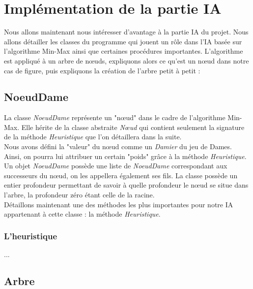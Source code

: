 \documentclass[12,french]{report}
\begin{document}
\section{Implémentation de la partie IA}

Nous allons maintenant nous intéresser d'avantage à la partie IA du projet. Nous allons détailler les classes du programme qui jouent un rôle dans l'IA basée sur l'algorithme Min-Max ainsi que certaines procédures importantes. L'algorithme est appliqué à un arbre de nœuds, expliquons alors ce qu'est un nœud dans notre cas de figure, puis expliquons la création de l'arbre petit à petit :

\subsection{NoeudDame}

La classe \textit{NoeudDame} représente un "nœud" dans le cadre de l'algorithme Min-Max. Elle hérite de la classe abstraite \textit{Nœud} qui contient seulement la signature de la méthode \textit{Heuristique} que l'on détaillera dans la suite. \\

Nous avons défini la "valeur" du nœud comme un \textit{Damier} du jeu de Dames. Ainsi, on pourra lui attribuer un certain "poids" grâce à la méthode \textit{Heuristique}.\\

Un objet \textit{NoeudDame} possède une liste de \textit{NoeudDame} correspondant aux successeurs du nœud, on les appellera également ses fils. La classe possède un entier profondeur permettant de savoir à quelle profondeur le nœud se situe dans l'arbre, la profondeur zéro étant celle de la racine. \\

Détaillons maintenant une des méthodes les plus importantes pour notre IA appartenant à cette classe : la méthode \textit{Heuristique}.\\

\subsubsection{L'heuristique}

...\\



\subsection{Arbre}
\end{document}
